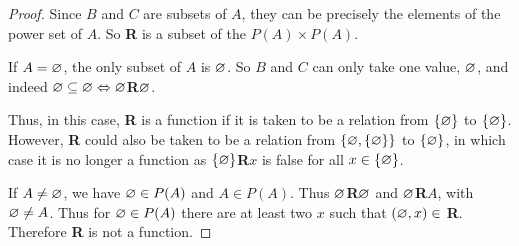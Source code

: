 \documentclass[12pt]{article}
\begin{document}
\begin{proof}
    Since $B$ and $C$ are subsets of $A$, they can be precisely the elements of the power set of $A$. So \textbf{R} is a subset of the $P(A) \times P(A)$.

    If $A = \varnothing$, the only subset of $A$ is $\varnothing$.
    So $B$ and $C$ can only take one value, $\varnothing$, and indeed $\varnothing \subseteq \varnothing \Leftrightarrow \varnothing$\textbf{R}$\varnothing$.

    Thus, in this case, \textbf{R} is a function if it is taken to be a relation from $\set{\O}$ to $\set{\O}$.
    However, \textbf{R} could also be taken to be a relation from $\set{\O, \{\O}\}$ to $\set{\O}$, in which case it is no longer a function as $\set{\O}$\textbf{R}$x$ is false for all $x \in \set{\O}$.

    If $A \neq \varnothing$, we have $\varnothing \in P(A)$ and $A \in P(A)$.
    Thus $\varnothing$\textbf{R}$\varnothing$ and $\varnothing$\textbf{R}$A$, with $\varnothing \neq A$.
    Thus for $\varnothing \in P(A)$ there are at least two $x$ such that $(\varnothing, x) \in$ \textbf{R}.
    Therefore \textbf{R} is not a function.
\end{proof}
\end{document}
